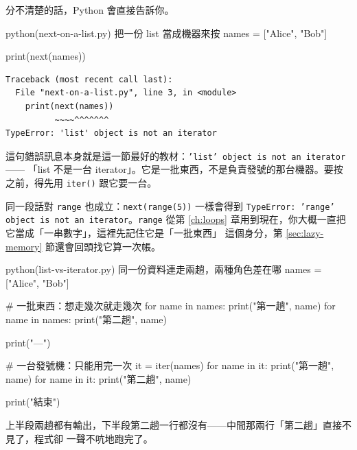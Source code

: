 分不清楚的話，Python 會直接告訴你。

\begin{example}{python}{(next-on-a-list.py) 把一份 list 當成機器來按}
names = ["Alice", "Bob"]

print(next(names))
\end{example}

\begin{verbatim}
Traceback (most recent call last):
  File "next-on-a-list.py", line 3, in <module>
    print(next(names))
          ~~~~^^^^^^^
TypeError: 'list' object is not an iterator
\end{verbatim}

這句錯誤訊息本身就是這一節最好的教材：\texttt{'list' object is not an iterator}——
「list 不是一台 iterator」。它是一批東西，不是負責發號的那台機器。要按之前，得先用
\texttt{iter()} 跟它要一台。

同一段話對 \texttt{range} 也成立：\texttt{next(range(5))} 一樣會得到
\texttt{TypeError: 'range' object is not an iterator}。\texttt{range} 從第
\ref{ch:loops} 章用到現在，你大概一直把它當成「一串數字」，這裡先記住它是「一批東西」
這個身分，第 \ref{sec:lazy-memory} 節還會回頭找它算一次帳。

\begin{example}{python}{(list-vs-iterator.py) 同一份資料連走兩趟，兩種角色差在哪}
names = ["Alice", "Bob"]

# 一批東西：想走幾次就走幾次
for name in names:
    print("第一趟", name)
for name in names:
    print("第二趟", name)

print("---")

# 一台發號機：只能用完一次
it = iter(names)
for name in it:
    print("第一趟", name)
for name in it:
    print("第二趟", name)

print("結束")
\end{example}


上半段兩趟都有輸出，下半段第二趟一行都沒有——中間那兩行「第二趟」直接不見了，程式卻
一聲不吭地跑完了。


